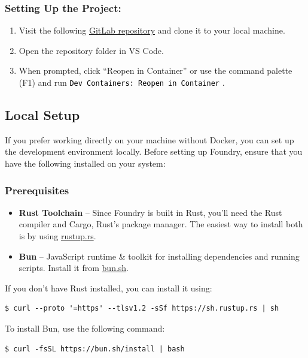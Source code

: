 \documentclass[12pt]{article}
\newcommand{\codegrey}[1]{%
  \texttt{\colorbox{black!4}{\textcolor{black}{#1}}}%
}
\begin{document}
\subsubsection*{Setting Up the Project:}

\begin{enumerate}
    \item Visit the following
          \href{https://gitlab.fel.cvut.cz/radovluk/smart-contracts-exercises/-/tree/main/09-Vulnerabilities-Detection/task/task-code}{GitLab
              repository} and clone it to your local machine.
    \item Open the repository folder in VS Code.
    \item When prompted, click ``Reopen in Container'' or use the command palette (F1) and
          run \codegrey{Dev Containers: Reopen in Container}.
\end{enumerate}

\subsection{Local Setup}

If you prefer working directly on your machine without Docker, you can set up
the development environment locally. Before setting up Foundry, ensure that you
have the following installed on your system:

\subsubsection*{Prerequisites}
\begin{itemize}
    \item \textbf{Rust Toolchain} -- Since Foundry is built in Rust, you'll need the Rust compiler and Cargo, Rust's package manager. The easiest way to install both is by using \href{https://rustup.rs/}{rustup.rs}.
    \item \textbf{Bun} -- JavaScript runtime \& toolkit for installing dependencies and running scripts. Install it from \href{https://bun.sh/}{bun.sh}.
\end{itemize}

\noindent
If you don't have Rust installed, you can install it using:

\begin{verbatim}
$ curl --proto '=https' --tlsv1.2 -sSf https://sh.rustup.rs | sh
\end{verbatim}

\noindent
To install Bun, use the following command:
\begin{verbatim}
$ curl -fsSL https://bun.sh/install | bash
\end{verbatim}
\end{document}
